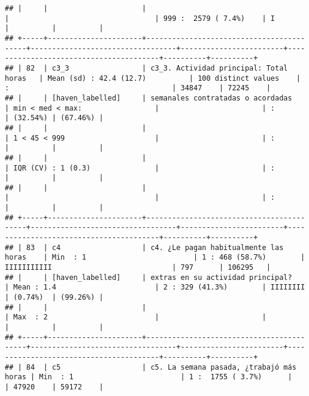 \documentclass[]{article}
\begin{document}
\begin{verbatim}
## |     |                      |                                          |                                  | 999 :  2579 ( 7.4%)    | I                                      |          |          |
## +-----+----------------------+------------------------------------------+----------------------------------+------------------------+----------------------------------------+----------+----------+
## | 82  | c3_3                 | c3_3. Actividad principal: Total horas   | Mean (sd) : 42.4 (12.7)          | 100 distinct values    | :                                      | 34847    | 72245    |
## |     | [haven_labelled]     | semanales contratadas o acordadas        | min < med < max:                 |                        | :                                      | (32.54%) | (67.46%) |
## |     |                      |                                          | 1 < 45 < 999                     |                        | :                                      |          |          |
## |     |                      |                                          | IQR (CV) : 1 (0.3)               |                        | :                                      |          |          |
## |     |                      |                                          |                                  |                        | :                                      |          |          |
## +-----+----------------------+------------------------------------------+----------------------------------+------------------------+----------------------------------------+----------+----------+
## | 83  | c4                   | c4. ¿Le pagan habitualmente las horas    | Min  : 1                         | 1 : 468 (58.7%)        | IIIIIIIIIII                            | 797      | 106295   |
## |     | [haven_labelled]     | extras en su actividad principal?        | Mean : 1.4                       | 2 : 329 (41.3%)        | IIIIIIII                               | (0.74%)  | (99.26%) |
## |     |                      |                                          | Max  : 2                         |                        |                                        |          |          |
## +-----+----------------------+------------------------------------------+----------------------------------+------------------------+----------------------------------------+----------+----------+
## | 84  | c5                   | c5. La semana pasada, ¿trabajó más horas | Min  : 1                         | 1 :  1755 ( 3.7%)      |                                        | 47920    | 59172    |

\end{verbatim}
\end{document}
